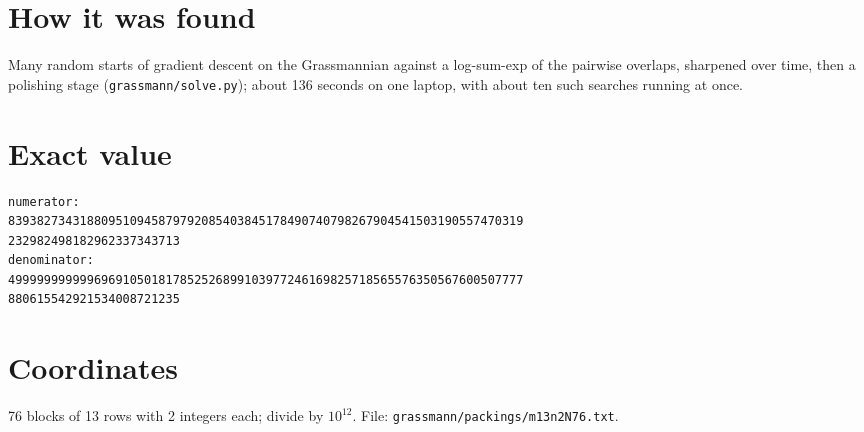 \documentclass[11pt,a4paper]{article}
\begin{document}
\section{How it was found}
Many random starts of gradient descent on the Grassmannian against a log-sum-exp of the pairwise overlaps, sharpened over time, then a polishing stage (\texttt{grassmann/solve.py}); about 136 seconds on one laptop, with about ten such searches running at once.


\appendix
\section{Exact value}
{\small
\begin{verbatim}
numerator:
839382734318809510945879792085403845178490740798267904541503190557470319
232982498182962337343713
denominator:
499999999999696910501817852526899103977246169825718565576350567600507777
880615542921534008721235
\end{verbatim}}

\section{Coordinates}
76 blocks of 13 rows with 2 integers each; divide by $10^{12}$. File: \texttt{grassmann/packings/m13n2N76.txt}.
{\tiny
\begin{multicols}{4}
\end{multicols}}
\end{document}
